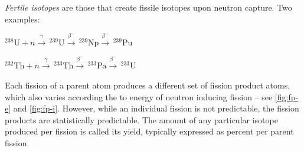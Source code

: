 \documentclass[12pt]{article}
\begin{document}
\textit{Fertile isotopes} are those that create fissile isotopes upon neutron capture. Two examples:

$^{238}\text{U}+n \stackrel{\gamma}{\rightarrow} \, ^{239}\text{U}\stackrel{\beta^-}{\rightarrow} \, ^{239}\text{Np}\stackrel{\beta^-}{\rightarrow} \, ^{239}\text{Pu}$

$^{232}\text{Th}+n \stackrel{\gamma}{\rightarrow} \,^{233}\text{Th}\stackrel{\beta^-}{\rightarrow}\, ^{233}\text{Pa}\stackrel{\beta^-}{\rightarrow} \, ^{233}\text{U}$

Each fission of a parent atom produces a different set of fission product atoms, which also varies according the to energy of neutron inducing fission -- see \autoref{fig:fp-e} and \autoref{fig:fp-i}. However, while an individual fission is not predictable, the fission products are statistically predictable. The amount of any particular isotope produced per fission is called its yield, typically expressed as percent per parent fission.
\end{document}
